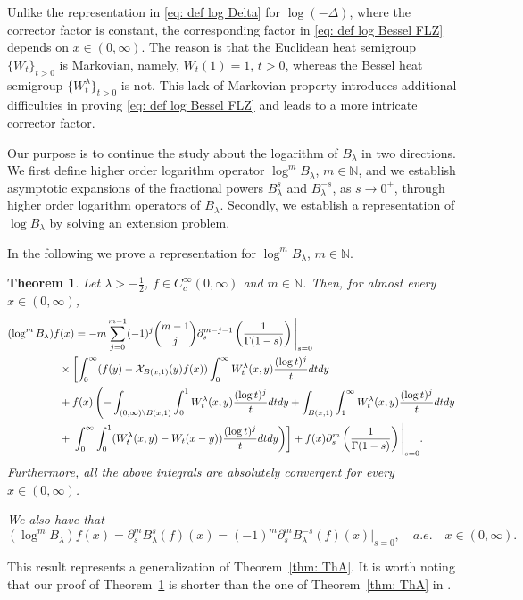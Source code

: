 \documentclass[a4paper,10pt, reqno]{amsart}
\newtheorem{thm}{Theorem}[section]
\theoremstyle{definition}
\theoremstyle{remark}
\numberwithin{equation}{section}
\begin{document}
Unlike the representation in \eqref{eq: def log Delta} for $\log(-\Delta)$, where the corrector factor is constant, the corresponding factor in \eqref{eq: def log Bessel FLZ} depends on $x\in(0,\infty)$. The reason is that the Euclidean heat semigroup $\{W_t\}_{t>0}$ is Markovian, namely, $W_t(1)=1$, $t>0$,  whereas the Bessel heat semigroup $\{W_t^\lambda\}_{t>0}$ is not. This lack of Markovian property introduces additional difficulties in proving \eqref{eq: def log Bessel FLZ} and leads to a more intricate corrector factor.

Our purpose is to continue the study about the logarithm of $B_\lambda$ in two directions. We first define higher order logarithm operator $\log^mB_\lambda$, $m\in \mathbb N$, and we establish asymptotic expansions of the fractional powers $B_\lambda^s$ and $B_\lambda^{-s}$, as $s\rightarrow 0^+$, through higher order logarithm operators of $B_\lambda$. Secondly, we establish a representation of $\log B_\lambda $ by solving an extension problem.


In the following we prove a representation for $\log^m B_\lambda $, $m\in \mathbb N$.

\begin{thm}\label{thm: Th1.2}
Let $\lambda >-\tfrac12$, $f\in C_c^\infty(0,\infty)$ and $m\in \mathbb N$. Then, for almost every $x\in (0,\infty)$, 
\begin{align*}
    (\log^m B_\lambda)f(x)&=-m\sum_{j=0}^{m-1}(-1)^j\binom{m-1}{j}\partial_s^{m-j-1}\left(\frac{1}{\Gamma (1-s)}\right)\Bigg|_{s=0}\\
    &\hspace{-0.5cm}\times \left[\int_0^\infty (f(y)-\mathcal X_{B(x,1)}(y)f(x))\int_0^\infty W_t^\lambda (x,y)\frac{(\log t)^j}{t}dtdy\right.\\
    &\hspace{-0.5cm}+f(x)\left(-\int_{(0,\infty)\setminus B(x,1)}\int_0^1W_t^\lambda (x,y)\frac{(\log t)^j}{t}dtdy+\int_{B(x,1)}\int_1^\infty W_t^\lambda (x,y)\frac{(\log t)^j}{t}dtdy\right.\\
&\hspace{-0.5cm}+\left.\left.\int_0^\infty \int_0^1(W_t^\lambda (x,y)-W_t(x-y))\frac{(\log t)^j}{t}dtdy\right)\right]+f(x)\partial_s^{m}\left(\frac{1}{\Gamma (1-s)}\right)\Bigg|_{s=0}.
\end{align*}
Furthermore, all the above integrals are absolutely convergent for every $x\in (0,\infty)$.

We also have that
\[
(\log^m B_\lambda)f(x)=\partial_s^m B_\lambda^s(f)(x)=(-1)^m\partial_s^m B_\lambda^{-s}(f)(x)\Big|_{s=0},\quad a.e.\quad x\in (0,\infty).
\]
\end{thm}
This result represents a generalization of Theorem~\ref{thm: ThA}. It is worth noting that our proof of Theorem~\ref{thm: Th1.2} is shorter than the one of Theorem~\ref{thm: ThA} in \cite{FLZ}.
\end{document}
